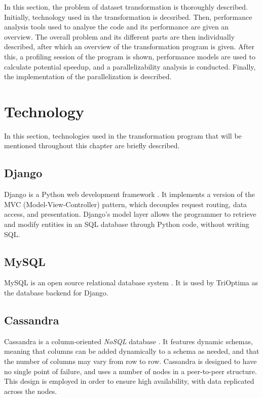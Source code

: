 In this section, the problem of dataset transformation is thoroughly described. Initially, technology used in the transformation is decsribed.
Then, performance analysis tools used to analyse the code and its performance are given an overview. The overall problem and its different parts
are then individually described, after which an overview of the transformation program is given. After this, a profiling session of the program
is shown, performance models are used to calculate potential speedup, and a parallelizability analysis is conducted. Finally, the implementation of
the parallelization is described.

\section{Technology}
In this section, technologies used in the transformation program that will be mentioned throughout this chapter are briefly described.


\subsection{Django}
Django is a Python web development framework \cite{holovaty_chapter_c1itd}. It implements a version of the MVC (Model-View-Controller) pattern, which decouples request routing, data access, and
presentation. Django's model layer allows the programmer to retrieve and modify entities in an SQL database through Python code, without writing SQL.

\subsection{MySQL}
MySQL is an open source relational database system \cite{what_wim}. It is used by TriOptima as the database backend for Django.

\subsection{Cassandra}
Cassandra is a column-oriented \textit{NoSQL} database \cite[p. 1-9]{mishra_2014_beginning_bacd}. It features dynamic schemas, meaning that columns can be added dynamically to a schema as needed, and that
the number of columns may vary from row to row. Cassandra is designed to have no single point of failure, and uses a number of nodes in a peer-to-peer structure. This design is
employed in order to ensure high availability, with data replicated across the nodes.

